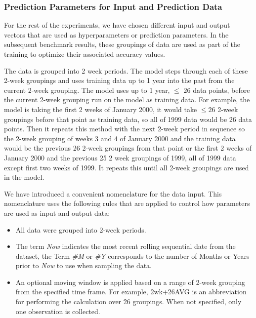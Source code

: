 \documentclass[utf8]{FrontiersinVancouver} %
\begin{document}
\subsubsection{Prediction Parameters for Input and Prediction Data}

For the rest of the experiments, we have chosen different input and output vectors that are used as hyperparameters or prediction parameters. In the subsequent benchmark results, these groupings of data are used as part of the training to optimize their associated accuracy values. 

The data is grouped into 2 week periods. The model steps through each of these 2-week groupings and uses training data up to 1 year into the past from the current 2-week grouping. The model uses up to 1 year, $\leq$ $ 26$ data points, before the current 2-week grouping run on the model as training data. For example, the model is taking the first 2 weeks of January 2000, it would take $ \leq 26$ 2-week groupings before that point as training data, so all of 1999 data would be 26 data points. Then it repeats this method with the next 2-week period in sequence so the 2-week grouping of weeks 3 and 4 of January 2000 and the training data would be the previous 26 2-week groupings from that point or the first 2 weeks of January 2000 and the previous 25 2 week groupings of 1999, all of 1999 data except first two weeks of 1999. It repeats this until all 2-week groupings are used in the model.

We have introduced a convenient nomenclature for the data input. This nomenclature uses the following rules that are applied to control how parameters are used as input and output data:

\begin{itemize}
  \item All data were grouped into 2-week periods.
  \item The term {\em Now} indicates the most recent rolling sequential date from the dataset, the Term {\em \#M} or {\em \#Y}    corresponds to the number of Months or Years prior to {\em Now} to use when sampling the data.
  \item An optional moving window is applied based on a range of    2-week grouping from the specified time frame.  For example,    2wk+26AVG is an abbreviation for performing the calculation over    26 groupings.  When not specified, only one observation is collected.
\end{itemize}
\end{document}
